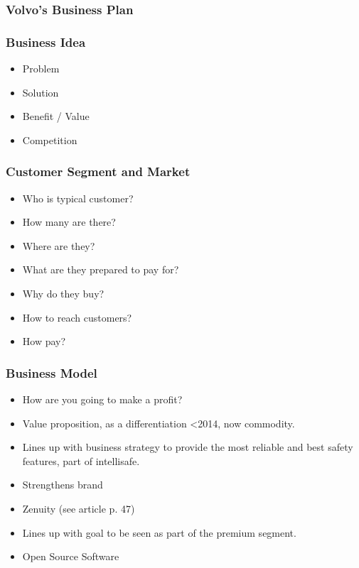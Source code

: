 \documentclass[conference]{IEEEtran}
\begin{document}
\subsubsection{Volvo's Business Plan}
\subsubsection{Business Idea}
\begin{itemize}
	\item Problem
	\item Solution
	\item Benefit / Value
	\item Competition
\end{itemize}
\subsubsection{Customer Segment and Market}
\begin{itemize}
	\item Who is typical customer?
	\item How many are there?
	\item Where are they?
	\item  What are they prepared to pay for?
	\item Why do they buy?
	\item How to reach customers?
	\item How pay?
\end{itemize}
\subsubsection{Business Model}
\begin{itemize}
	\item How are you going to make a profit?
\end{itemize}
\begin{itemize}
	\item Value proposition, as a differentiation <2014, now commodity.
	\item Lines up with business strategy to provide the most reliable and best safety features, part of intellisafe.
	\item Strengthens brand
	\item Zenuity (see article p. 47)
	\item Lines up with goal to be seen as part of the premium segment.
	\item Open Source Software
\end{itemize}
\fi
\end{document}
